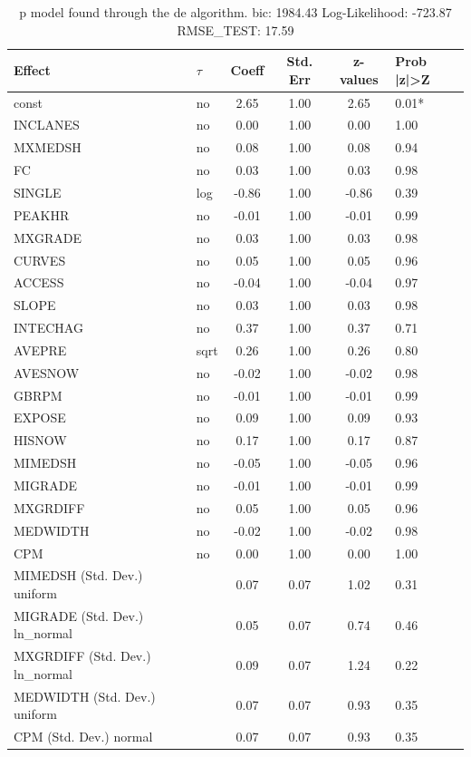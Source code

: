 \begin{table}
	\caption{p model found through the de algorithm. bic: 1984.43 Log-Likelihood: -723.87 RMSE_TEST: 17.59}
	\begin{center}
		\begin{tabular}{|l|l|c|c|c|l|}
			\hline
			Effect & $\tau$ & Coeff & Std. Err & z-values & Prob |z|>Z \\
			\hline
			const & no & 2.65 & 1.00 & 2.65 & 0.01* \\
			\hline
			INCLANES & no & 0.00 & 1.00 & 0.00 & 1.00 \\
			\hline
			MXMEDSH & no & 0.08 & 1.00 & 0.08 & 0.94 \\
			\hline
			FC & no & 0.03 & 1.00 & 0.03 & 0.98 \\
			\hline
			SINGLE & log & -0.86 & 1.00 & -0.86 & 0.39 \\
			\hline
			PEAKHR & no & -0.01 & 1.00 & -0.01 & 0.99 \\
			\hline
			MXGRADE & no & 0.03 & 1.00 & 0.03 & 0.98 \\
			\hline
			CURVES & no & 0.05 & 1.00 & 0.05 & 0.96 \\
			\hline
			ACCESS & no & -0.04 & 1.00 & -0.04 & 0.97 \\
			\hline
			SLOPE & no & 0.03 & 1.00 & 0.03 & 0.98 \\
			\hline
			INTECHAG & no & 0.37 & 1.00 & 0.37 & 0.71 \\
			\hline
			AVEPRE & sqrt & 0.26 & 1.00 & 0.26 & 0.80 \\
			\hline
			AVESNOW & no & -0.02 & 1.00 & -0.02 & 0.98 \\
			\hline
			GBRPM & no & -0.01 & 1.00 & -0.01 & 0.99 \\
			\hline
			EXPOSE & no & 0.09 & 1.00 & 0.09 & 0.93 \\
			\hline
			HISNOW & no & 0.17 & 1.00 & 0.17 & 0.87 \\
			\hline
			MIMEDSH & no & -0.05 & 1.00 & -0.05 & 0.96 \\
			\hline
			MIGRADE & no & -0.01 & 1.00 & -0.01 & 0.99 \\
			\hline
			MXGRDIFF & no & 0.05 & 1.00 & 0.05 & 0.96 \\
			\hline
			MEDWIDTH & no & -0.02 & 1.00 & -0.02 & 0.98 \\
			\hline
			CPM & no & 0.00 & 1.00 & 0.00 & 1.00 \\
			\hline
			MIMEDSH (Std. Dev.) uniform &  & 0.07 & 0.07 & 1.02 & 0.31 \\
			\hline
			MIGRADE (Std. Dev.) ln_normal &  & 0.05 & 0.07 & 0.74 & 0.46 \\
			\hline
			MXGRDIFF (Std. Dev.) ln_normal &  & 0.09 & 0.07 & 1.24 & 0.22 \\
			\hline
			MEDWIDTH (Std. Dev.) uniform &  & 0.07 & 0.07 & 0.93 & 0.35 \\
			\hline
			CPM (Std. Dev.) normal &  & 0.07 & 0.07 & 0.93 & 0.35 \\
			\hline
		\end{tabular}
	\end{center}
\end{table}